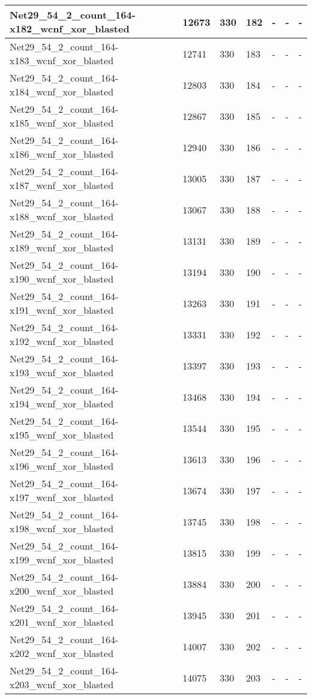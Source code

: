 \begin{scriptsize}
\begin{longtable}{|p{5cm}|l|l|l|l|l|l|}
Net29\_54\_2\_count\_164-x182\_wcnf\_xor\_blasted&12673&330&182&-&-&- \\ \hline 
Net29\_54\_2\_count\_164-x183\_wcnf\_xor\_blasted&12741&330&183&-&-&- \\ \hline 
Net29\_54\_2\_count\_164-x184\_wcnf\_xor\_blasted&12803&330&184&-&-&- \\ \hline 
Net29\_54\_2\_count\_164-x185\_wcnf\_xor\_blasted&12867&330&185&-&-&- \\ \hline 
Net29\_54\_2\_count\_164-x186\_wcnf\_xor\_blasted&12940&330&186&-&-&- \\ \hline 
Net29\_54\_2\_count\_164-x187\_wcnf\_xor\_blasted&13005&330&187&-&-&- \\ \hline 
Net29\_54\_2\_count\_164-x188\_wcnf\_xor\_blasted&13067&330&188&-&-&- \\ \hline 
Net29\_54\_2\_count\_164-x189\_wcnf\_xor\_blasted&13131&330&189&-&-&- \\ \hline 
Net29\_54\_2\_count\_164-x190\_wcnf\_xor\_blasted&13194&330&190&-&-&- \\ \hline 
Net29\_54\_2\_count\_164-x191\_wcnf\_xor\_blasted&13263&330&191&-&-&- \\ \hline 
Net29\_54\_2\_count\_164-x192\_wcnf\_xor\_blasted&13331&330&192&-&-&- \\ \hline 
Net29\_54\_2\_count\_164-x193\_wcnf\_xor\_blasted&13397&330&193&-&-&- \\ \hline 
Net29\_54\_2\_count\_164-x194\_wcnf\_xor\_blasted&13468&330&194&-&-&- \\ \hline 
Net29\_54\_2\_count\_164-x195\_wcnf\_xor\_blasted&13544&330&195&-&-&- \\ \hline 
Net29\_54\_2\_count\_164-x196\_wcnf\_xor\_blasted&13613&330&196&-&-&- \\ \hline 
Net29\_54\_2\_count\_164-x197\_wcnf\_xor\_blasted&13674&330&197&-&-&- \\ \hline 
Net29\_54\_2\_count\_164-x198\_wcnf\_xor\_blasted&13745&330&198&-&-&- \\ \hline 
Net29\_54\_2\_count\_164-x199\_wcnf\_xor\_blasted&13815&330&199&-&-&- \\ \hline 
Net29\_54\_2\_count\_164-x200\_wcnf\_xor\_blasted&13884&330&200&-&-&- \\ \hline 
Net29\_54\_2\_count\_164-x201\_wcnf\_xor\_blasted&13945&330&201&-&-&- \\ \hline 
Net29\_54\_2\_count\_164-x202\_wcnf\_xor\_blasted&14007&330&202&-&-&- \\ \hline 
Net29\_54\_2\_count\_164-x203\_wcnf\_xor\_blasted&14075&330&203&-&-&- \\ \hline 

\end{longtable}
\end{scriptsize}
